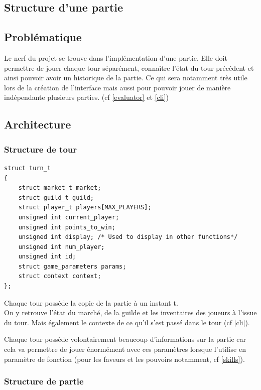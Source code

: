 \subsection*{Structure d'une partie}

\label{game}

\subsection*{Problématique}

Le nerf du projet se trouve dans l'implémentation d'une partie. Elle doit permettre de jouer chaque tour séparément, connaître l'état du tour précédent et ainsi pouvoir avoir un historique de la partie. Ce qui sera notamment très utile lors de la création de l'interface mais aussi pour pouvoir jouer de manière indépendante plusieurs parties. (cf \ref{evaluator} et \ref{cli})
\subsection*{Architecture}

\subsubsection*{Structure de tour}

\begin{lstlisting}[frame=single, caption={Implémentation de la structure turn\_t}]
struct turn_t
{
	struct market_t market;
	struct guild_t guild;
	struct player_t players[MAX_PLAYERS];
	unsigned int current_player;
	unsigned int points_to_win;
	unsigned int display; /* Used to display in other functions*/
	unsigned int num_player;
	unsigned int id;
	struct game_parameters params;
	struct context context;
};
\end{lstlisting}

Chaque tour possède la copie de la partie à un instant t.\\
On y retrouve l'état du marché, de la guilde et les inventaires des joueurs à l'issue du tour. Mais également le contexte de ce qu'il s'est passé dans le tour (cf \ref{cli}).

Chaque tour possède volontairement beaucoup d'informations sur la partie car cela va permettre de jouer énormément avec ces paramètres lorsque l'utilise en paramètre de fonction (pour les faveurs et les pouvoirs notamment, cf \ref{skills}).

\subsubsection*{Structure de partie}

